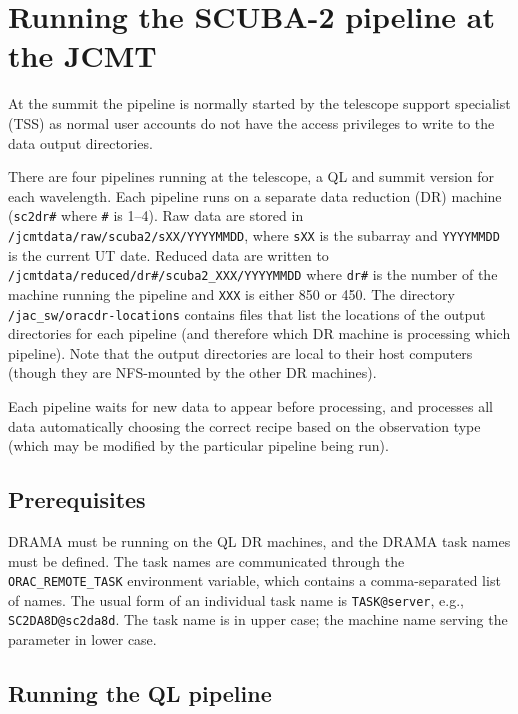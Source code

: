 \section{Running the SCUBA-2 pipeline at the JCMT\label{se:runpipe}}

At the summit the pipeline is normally started by the telescope
support specialist (TSS) as normal user accounts do not have the
access privileges to write to the data output directories.

There are four pipelines running at the telescope, a QL and summit
version for each wavelength. Each pipeline runs on a separate data
reduction (DR) machine (\verb+sc2dr#+ where \verb+#+ is 1--4). Raw
data are stored in \verb+/jcmtdata/raw/scuba2/sXX/YYYYMMDD+, where
\verb+sXX+ is the subarray and \verb+YYYYMMDD+ is the current UT
date. Reduced data are written
to\\ \verb+/jcmtdata/reduced/dr#/scuba2_XXX/YYYYMMDD+ where \verb+dr#+
is the number of the machine running the pipeline and \verb+XXX+ is
either 850 or 450. The directory \verb+/jac_sw/oracdr-locations+
contains files that list the locations of the output directories for
each pipeline (and therefore which DR machine is processing which
pipeline). Note that the output directories are local to their host
computers (though they are NFS-mounted by the other DR machines).

Each pipeline waits for new data to appear before processing, and
processes all data automatically choosing the correct recipe based on
the observation type (which may be modified by the particular pipeline
being run).

\subsection{Prerequisites}

DRAMA must be running on the QL DR machines, and the DRAMA task names
must be defined. The task names are communicated through the
\verb+ORAC_REMOTE_TASK+ environment variable, which contains a
comma-separated list of names. The usual form of an individual task
name is \verb+TASK@server+, e.g., \verb+SC2DA8D@sc2da8d+. The task
name is in upper case; the machine name serving the parameter in lower
case.

\subsection{Running the QL pipeline}

